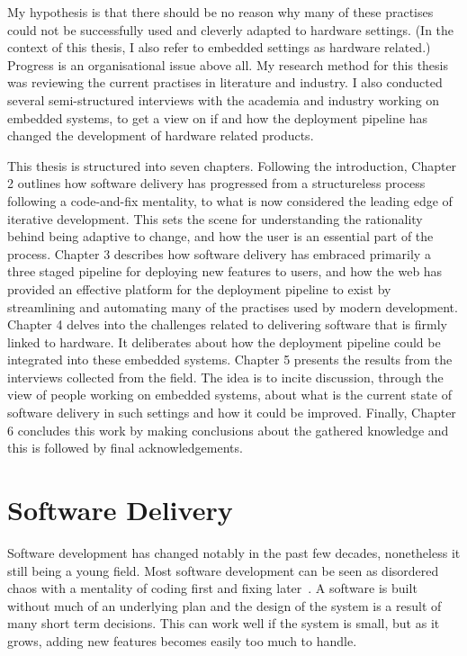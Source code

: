 \documentclass[english]{tktltiki2}
\begin{document}
My hypothesis is that there should be no reason why many of these practises could not be successfully used and cleverly adapted to hardware settings. (In the context of this thesis, I also refer to embedded settings as hardware related.) Progress is an organisational issue above all. My research method for this thesis was reviewing the current practises in literature and industry. I also conducted several semi-structured interviews with the academia and industry working on embedded systems, to get a view on if and how the deployment pipeline has changed the development of hardware related products.

This thesis is structured into seven chapters. Following the introduction, Chapter 2 outlines how software delivery has progressed from a structureless process following a code-and-fix mentality, to what is now considered the leading edge of iterative development. This sets the scene for understanding the rationality behind being adaptive to change, and how the user is an essential part of the process. Chapter 3 describes how software delivery has embraced primarily a three staged pipeline for deploying new features to users, and how the web has provided an effective platform for the deployment pipeline to exist by streamlining and automating many of the practises used by modern development. Chapter 4 delves into the challenges related to delivering software that is firmly linked to hardware. It deliberates about how the deployment pipeline could be integrated into these embedded systems. Chapter 5 presents the results from the interviews collected from the field. The idea is to incite discussion, through the view of people working on embedded systems, about what is the current state of software delivery in such settings and how it could be improved. Finally, Chapter 6 concludes this work by making conclusions about the gathered knowledge and this is followed by final acknowledgements.


\section{Software Delivery}

Software development has changed notably in the past few decades, nonetheless it still being a young field. Most software development can be seen as disordered chaos with a mentality of coding first and fixing later~\cite{Boe88, Fow05}. A software is built without much of an underlying plan and the design of the system is a result of many short term decisions. This can work well if the system is small, but as it grows, adding new features becomes easily too much to handle.
\end{document}
